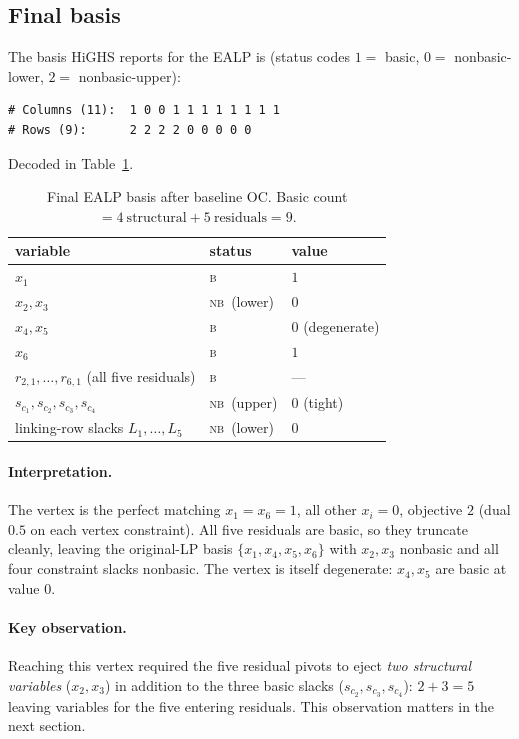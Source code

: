 \documentclass[11pt]{article}
\newcommand{\nb}{\textsc{nb}}
\newcommand{\bas}{\textsc{b}}
\newcommand{\slack}[1]{s_{#1}}
\begin{document}
\subsection*{Final basis}
The basis HiGHS reports for the EALP is (status codes
$1=$ basic, $0=$ nonbasic-lower, $2=$ nonbasic-upper):
\begin{verbatim}
# Columns (11):  1 0 0 1 1 1 1 1 1 1 1
# Rows (9):      2 2 2 2 0 0 0 0 0
\end{verbatim}
Decoded in Table~\ref{tab:basefinal}.

\begin{table}[h]
\centering
\begin{tabular}{lll}
\toprule
variable & status & value\\
\midrule
$x_1$ & \bas & $1$\\
$x_2,x_3$ & \nb\ (lower) & $0$\\
$x_4,x_5$ & \bas & $0$ (degenerate)\\
$x_6$ & \bas & $1$\\
$r_{2,1},\dots,r_{6,1}$ (all five residuals) & \bas & ---\\
$\slack{c_1},\slack{c_2},\slack{c_3},\slack{c_4}$ & \nb\ (upper) & $0$ (tight)\\
linking-row slacks $L_1,\dots,L_5$ & \nb\ (lower) & $0$\\
\bottomrule
\end{tabular}
\caption{Final EALP basis after baseline OC. Basic count
$=4\ \text{structural}+5\ \text{residuals}=9$.}
\label{tab:basefinal}
\end{table}

\paragraph{Interpretation.}
The vertex is the perfect matching $x_1=x_6=1$, all other $x_i=0$, objective $2$
(dual $0.5$ on each vertex constraint). All five residuals are basic, so they
truncate cleanly, leaving the original-LP basis $\{x_1,x_4,x_5,x_6\}$ with
$x_2,x_3$ nonbasic and all four constraint slacks nonbasic. The vertex is itself
degenerate: $x_4,x_5$ are basic at value $0$.

\paragraph{Key observation.}
Reaching this vertex required the five residual pivots to eject \emph{two
structural variables} ($x_2,x_3$) in addition to the three basic slacks
($\slack{c_2},\slack{c_3},\slack{c_4}$): $2+3=5$ leaving variables for the five
entering residuals. This observation matters in the next section.
\end{document}
